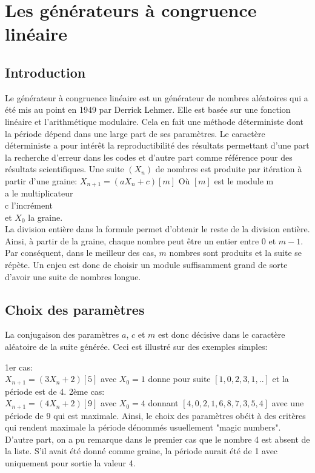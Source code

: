 \documentclass{scrartcl}
\begin{document}
\section{Les générateurs à congruence linéaire}
\subsection{Introduction}
Le générateur à congruence linéaire est un générateur de nombres aléatoires qui a été mis au point en 1949 par Derrick Lehmer. Elle est basée sur une fonction linéaire et l'arithmétique modulaire. Cela en fait une méthode déterministe dont la période dépend dans une large part de ses paramètres.
Le caractère déterministe a pour intérêt la reproductibilité des résultats permettant d'une part la recherche d'erreur dans les codes et d'autre part comme référence pour des résultats scientifiques.
Une suite $(X_n)$ de nombres est produite par itération à partir d'une graine:
$X_{n+1} = (a X_n +c)[m]$
Où $[m]$ est le module m \\
a le multiplicateur \\
c l'incrément \\
et $X_0$ la graine. \\

La division entière dans la formule permet d'obtenir le reste de la division entière. Ainsi, à partir de la graine, chaque nombre peut être un entier entre 0 et $m-1$.
Par conséquent, dans le meilleur des cas, $m$ nombres sont produits et la suite se répète.
Un enjeu est donc de choisir un module suffisamment grand de sorte d'avoir une suite de nombres longue.

\subsection{Choix des paramètres}
La conjugaison des paramètres $a$, $c$ et $m$ est donc décisive dans le caractère aléatoire de la suite générée. Ceci est illustré sur des exemples simples:

1er cas:\\
$X_{n+1} = (3 X_n +2)[5]$ avec $X_0 = 1$ donne pour suite $[1,0,2,3,1,..]$ et la période est de 4.
2ème cas:\\
$X_{n+1} = (4 X_n +2)[9]$ avec $X_0 = 4$  donnant $[4,0,2,1,6,8,7,3,5,4]$ avec une période de 9 qui est maximale.
Ainsi, le choix des paramètres obéit à des critères qui rendent maximale la période dénommés usuellement "magic numbers".
D'autre part, on a pu remarque dans le premier cas que le nombre 4 est absent de la liste. S'il avait été donné comme graine, la période aurait été de 1 avec uniquement pour sortie la valeur 4.
\end{document}
